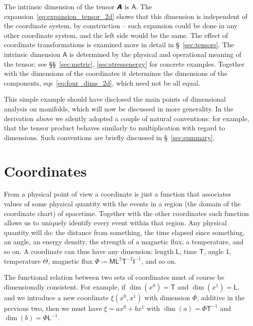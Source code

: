 \documentclass[\ifafour a4paper,12pt,\else a5paper,10pt,\fi%
onecolumn,oneside,article,%
british%
]{memoir}
\theoremstyle{remark}
\theoremstyle{innote}
\newcommand*{\mathte}[1]{\textbf{\textit{\textsf{#1}}}}
\newcommand*{\defd}{\coloneqq}
\renewcommand*{\|}[1][]{\nonscript\,#1\vert\nonscript\;\mathopen{}}
\newcommand*{\sect}{\S}%
\newcommand*{\sects}{\S\S}%
\newcommand*{\eqns}{eqs}%
\newcommand*{\Un}{\textsf{1}}
\newcommand*{\Le}{\textsf{L}}
\newcommand*{\Ti}{\textsf{T}}
\newcommand*{\Ma}{\textsf{M}}
\newcommand*{\Te}{\Theta}
\newcommand*{\Cu}{\textsf{I}}
\newcommand*{\Fl}{\Phi}
\newcommand*{\Aa}{\textsf{A}}
\newcommand*{\yA}{\mathte{A}}
\begin{document}
The intrinsic dimension of the tensor $\yA$ is $\Aa$. The
expansion~\eqref{eq:expansion_tensor_2d} shows that this dimension is
independent of the coordinate system, by construction -- such expansion
could be done in any other coordinate system, and the left side would be
the same. The effect of coordinate transformations is examined more in
detail in \sect~\ref{sec:tensors}. The intrinsic dimension $\Aa$ is
determined by the physical and operational meaning of the tensor; see
\sects~\ref{sec:metric}, \ref{sec:stressenergy} for concrete examples.
Together with the dimensions of the coordinates it determines the
dimensions of the components, \eqns~\eqref{eq:four_dims_2d}, which need not
be all equal.

This simple example should have disclosed the main points of dimensional
analysis on manifolds, which will now be discussed in more generality. In
the derivation above we silently adopted a couple of natural conventions:
for example, that the tensor product behaves similarly to multiplication
with regard to dimensions. Such conventions are briefly discussed in
\sect~\ref{sec:summary}.


\section{Coordinates}
\label{sec:coords}

From a physical point of view a coordinate is just a function that
associates values of some physical quantity with the events in a region
(the domain of the coordinate chart) of spacetime. Together with the other
coordinates such function allows us to uniquely identify every event
within that region. Any physical quantity will do: the distance from
something, the time elapsed since something, an angle, an energy density,
the strength of a magnetic flux, a temperature, and so on. A coordinate can
thus have any dimension: length $\Le$, time $\Ti$, angle $\Un$, temperature
$\Te$, magnetic flux $\Fl \defd \Ma\Le^{2}\Ti^{-2}\Cu^{-1}$, and so on.

The functional relation between two sets of coordinates must of course be
dimensionally consistent. For example, if $\dim(x^{0})=\Ti$ and
$\dim(x^{1})=\Le$, and we introduce a new coordinate $\xi(x^{0},x^{1})$
with dimension $\Fl$, additive in the previous two, then we must have
$\xi = a x^{0} + b x^{1}$ with $\dim(a) = \Fl\Ti^{-1}$ and
$\dim(b) = \Fl\Le^{-1}$.

\end{document}
